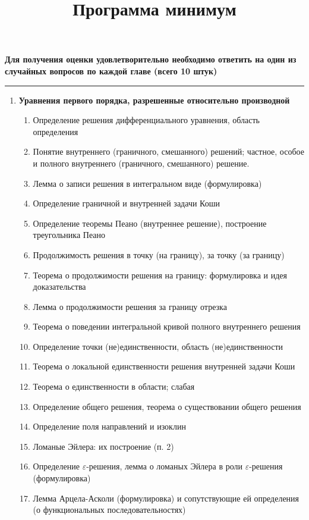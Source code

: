 \documentclass[fleqn]{article}
\title{Программа минимум}
\date{}
\begin{document}
	\maketitle
	\begin{center}
		\textbf{Для получения оценки удовлетворительно необходимо ответить на один из случайных вопросов по каждой главе (всего 10 штук)}\hrule
	\end{center}
	\begin{enumerate}[start = 1, label =\textbf{Глава \arabic*.}]
		\item \textbf{Уравнения первого порядка, разрешенные относительно
			производной}
			\begin{enumerate}[label=1.\arabic*.]
				\item Определение решения дифференциального уравнения, область определения
				\item Понятие внутреннего (граничного, смешанного) решений; частное, особое и полного внутреннего (граничного, смешанного) решение. 
				\item Лемма о записи решения в интегральном виде (формулировка)
				\item Определение граничной и внутренней задачи Коши 
				\item Определение теоремы Пеано (внутреннее решение), построение треугольника Пеано
				\item Продолжимость решения в точку (на границу), за точку (за границу)
				\item Теорема о продолжимости решения на границу: формулировка и идея доказательства
				\item Лемма о продолжимости решения за границу отрезка
				\item Теорема о поведении интегральной кривой полного внутреннего решения
				\item Определение точки (не)единственности, область (не)единственности
				\item Теорема о локальной единственности решения внутренней задачи Коши
				\item Теорема о единственности в области; слабая
				\item Определение общего решения, теорема о существовании общего решения
				\item Определение поля направлений и изоклин
				\item Ломаные Эйлера: их построение (п. 2)
				\item Определение $\varepsilon$-решения, лемма о ломаных Эйлера в роли $\varepsilon$-решения (формулировка)
				\item Лемма Арцела-Асколи (формулировка) и сопутствующие ей определения (о функциональных последовательностях)

\end{enumerate}
\end{enumerate}
\end{document}
